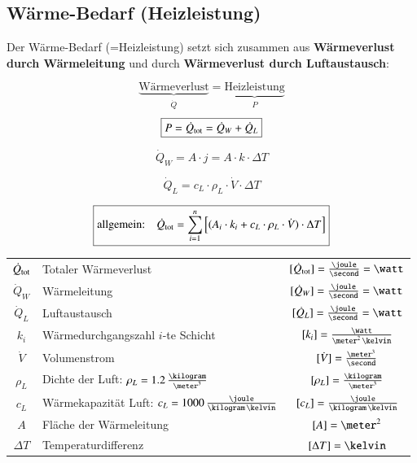 \subsection{Wärme-Bedarf (Heizleistung)}

Der Wärme-Bedarf (=Heizleistung) setzt sich zusammen aus \textbf{Wärmeverlust durch Wärmeleitung} und durch
\textbf{Wärmeverlust durch Luftaustausch}: 

$$ \underbrace{\text{Wärmeverlust}}_{\substack{\dot{Q}}}  = \underbrace{\text{Heizleistung}}_{\substack{P}} $$
$$ \boxed{ P = \dot{Q}_{\rm tot} = \dot{Q}_W + \dot{Q}_L }  $$

\begin{minipage}{0.4\columnwidth}
	$$ \boxed{ \dot{Q}_W = A \cdot j = A \cdot k \cdot \Delta T } $$
\end{minipage}
\hfill
\begin{minipage}{0.4\columnwidth}
	$$ \boxed{ \dot{Q}_L = c_L \cdot \rho_L \cdot \dot{V} \cdot \Delta T} $$
\end{minipage}

$$ \boxed{ \text{allgemein:} \quad \dot{Q}_{\rm tot} = \sum_{i=1}^n  \Big[ (A_i \cdot k_i + c_L \cdot \rho_L \cdot \dot{V} ) \cdot \Delta T \Big] } $$


\renewcommand{\arraystretch}{1.3}
\begin{tabular}{c l c}
	$\dot{Q}_{\rm tot}$	& Totaler Wärmeverlust														& $[\dot{Q}_{\rm tot}] = \frac{\joule}{\second} = \watt$	\\
	$\dot{Q}_W$ 		& Wärmeleitung 																& $[\dot{Q}_W] = \frac{\joule}{\second} = \watt$			\\
	$\dot{Q}_L$ 		& Luftaustausch 															& $[\dot{Q}_L] = \frac{\joule}{\second} = \watt$			\\
	$k_i$ 				& Wärmedurchgangszahl $i$-te Schicht 										& $[k_i] = \frac{\watt}{\meter^2 \, \kelvin}$ 				\\
	$\dot{V}$ 			& Volumenstrom 																& $[\dot{V}] = \frac{\meter^3}{\second}$ 					\\
	$\rho_L$ 			& Dichte der Luft: $\rho_L = 1.2 \, \frac{\kilogram}{\meter^3}$				& $[\rho_L] = \frac{\kilogram}{\meter^3}$ 					\\
	$c_L$ 				& Wärmekapazität Luft: $c_L = 1000 \, \frac{\joule}{\kilogram \, \kelvin}$ 	& $[c_L] = \frac{\joule}{\kilogram \, \kelvin}$ 			\\
	$A$ 				& Fläche der Wärmeleitung 													& $[A] = \meter^2$ 											\\
	$\Delta T$ 			& Temperaturdifferenz 														& $[\Delta T] = \kelvin$
\end{tabular}
\renewcommand{\arraystretch}{1}



